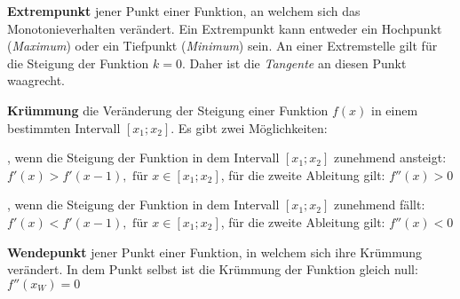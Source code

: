 \pagebreak

\begin{figure}[h!]
\centering
\end{figure}

\textbf{Extrempunkt}  jener Punkt einer Funktion, an welchem sich das Monotonieverhalten ver\"{a}ndert. Ein Extrempunkt kann entweder ein Hochpunkt (\emph{Maximum}) oder ein Tiefpunkt (\emph{Minimum}) sein. An einer Extremstelle gilt f\"{u}r die Steigung der Funktion $k = 0$. Daher ist die \emph{Tangente} an diesen Punkt waagrecht.

\textbf{Kr\"{u}mmung}  die Ver\"{a}nderung der Steigung einer Funktion $f(x)$ in einem bestimmten Intervall $[x_{1}; x_{2}]$. Es gibt zwei M\"{o}glichkeiten:

\begin{itemize}
	, wenn die Steigung der Funktion in dem Intervall $[x_{1}; x_{2}]$ zunehmend ansteigt: $f'(x) > f'(x-1), \text{ f\"{u}r } x \in [x_{1}; x_{2}]$, f\"{u}r die zweite Ableitung gilt: $f''(x) > 0$

	, wenn die Steigung der Funktion in dem Intervall $[x_{1}; x_{2}]$ zunehmend f\"{a}llt: $f'(x) < f'(x-1), \text{ f\"{u}r } x \in [x_{1}; x_{2}]$, f\"{u}r die zweite Ableitung gilt: $f''(x) < 0$
\end{itemize}

\textbf{Wendepunkt}  jener Punkt einer Funktion, in welchem sich ihre Kr\"{u}mmung ver\"{a}ndert. In dem Punkt selbst ist die Kr\"{u}mmung der Funktion gleich null: $f''(x_{W}) = 0$

